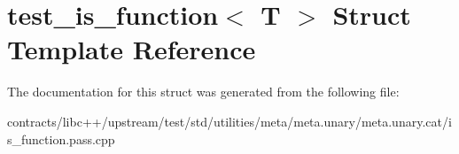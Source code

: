 \hypertarget{structtest__is__function}{}\section{test\+\_\+is\+\_\+function$<$ T $>$ Struct Template Reference}
\label{structtest__is__function}


The documentation for this struct was generated from the following file\+:\begin{DoxyCompactItemize}
\item 
contracts/libc++/upstream/test/std/utilities/meta/meta.\+unary/meta.\+unary.\+cat/is\+\_\+function.\+pass.\+cpp\end{DoxyCompactItemize}

